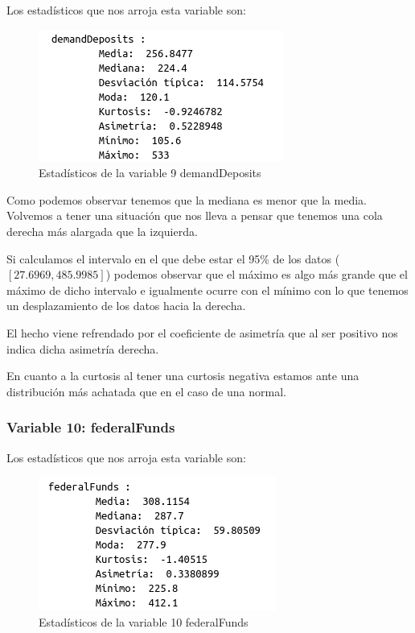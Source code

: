 \documentclass[12pt,a4paper]{article}
\begin{document}
Los estadísticos que nos arroja esta variable son:

\begin{figure}[H]
	\centering
	\includegraphics[scale=0.7]{./Imagenes/EDA/Regresion/estadisticos_demandDeposits.png}
	\caption{Estadísticos de la variable 9 demandDeposits}
\end{figure}

Como podemos observar tenemos que la mediana es menor que la media. Volvemos a tener una situación que nos lleva a pensar que tenemos una cola derecha más alargada que la izquierda.

Si calculamos el intervalo en el que debe estar el 95\% de los datos ($[27.6969,485.9985]$) podemos observar que el máximo es algo más grande que el máximo de dicho intervalo e igualmente ocurre con el mínimo con lo que tenemos un desplazamiento de los datos hacia la derecha.

El hecho viene refrendado por el coeficiente de asimetría que al ser positivo nos indica dicha asimetría derecha.

En cuanto a la curtosis al tener una curtosis negativa estamos ante una distribución más achatada que en el caso de una normal.

\subsubsection*{Variable 10: federalFunds}

Los estadísticos que nos arroja esta variable son:

\begin{figure}[H]
	\centering
	\includegraphics[scale=0.7]{./Imagenes/EDA/Regresion/estadisticos_federalFunds.png}
	\caption{Estadísticos de la variable 10 federalFunds}
\end{figure}
\end{document}
